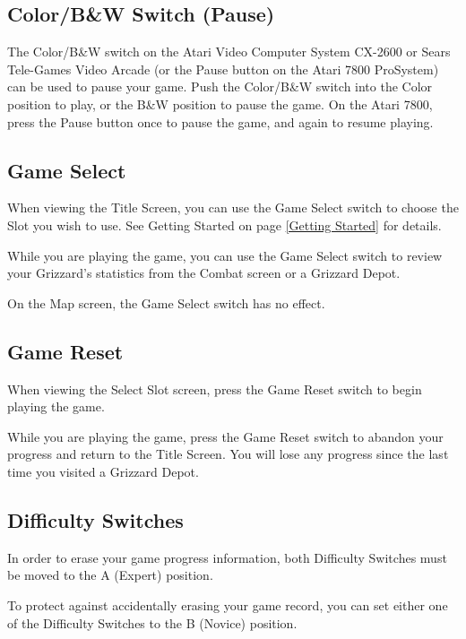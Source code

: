 \documentclass[12pt,twoside,openright,book]{memoir}
\begin{document}
\ifdefined\TVSECAM
\else

\subsection{Color/B\&W Switch (Pause)}

The  Color/B\&W switch  on the  Atari Video  Computer System  CX-2600 or
Sears Tele-Games  Video Arcade (or  the Pause  button on the  Atari 7800
ProSystem) can  be used to pause  your game. Push the  Color/B\&W switch
into the Color position to play, or the B\&W position to pause the game.
On the Atari  7800, press the Pause  button once to pause  the game, and
again to resume playing.

\fi

\subsection{Game Select}

When viewing  the Title Screen,  you can use  the Game Select  switch to
choose  the  Slot  you  wish  to   use.  See  Getting  Started  on  page
\ref{Getting Started} for details.

While you are  playing the game, you  can use the Game  Select switch to
review   your  Grizzard's   statistics   from  the   Combat  screen   or
a Grizzard Depot.

On the Map screen, the Game Select switch has no effect.

\subsection{Game Reset}

When viewing  the Select  Slot screen,  press the  Game Reset  switch to
begin playing the game.

While you are  playing the game, press the Game  Reset switch to abandon
your progress and return to the Title Screen. You will lose any progress
since the last time you visited a Grizzard Depot.

\subsection{Difficulty Switches}

In  order  to erase  your  game  progress information,  both  Difficulty
Switches must be moved to the A (Expert) position.

To protect  against accidentally erasing  your game record, you  can set
either one of the Difficulty Switches to the B (Novice) position.
\end{document}
